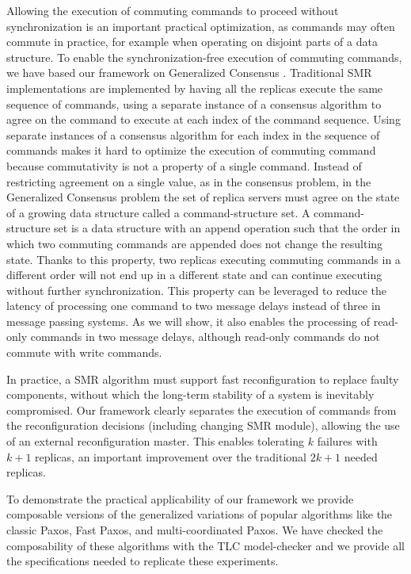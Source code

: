 Allowing the execution of commuting commands to proceed without synchronization is an important practical optimization, as commands may often commute in practice, for example when operating on disjoint parts of a data structure. 
To enable the synchronization-free execution of commuting commands, we have based our framework on Generalized Consensus \cite{Lamport05GeneralizeConsensus}. Traditional SMR implementations are implemented by having all the replicas execute the same sequence of commands, using a separate instance of a consensus algorithm to agree on the command to execute at each index of the command sequence. Using separate instances of a consensus algorithm for each index in the sequence of commands
makes it hard to optimize the execution of commuting command because commutativity is not a property of a single command.
Instead of restricting agreement on a single value, as in the consensus problem, in the  Generalized Consensus problem the set of replica servers must agree on the state of a growing data structure called a command-structure set. A command-structure set is a data structure with an append operation such that the order in which two commuting commands are appended does not change the resulting state. Thanks to this property, two replicas executing commuting commands in a different order will
not end up in a different state and can continue executing without further synchronization. This property can be leveraged to reduce the latency of processing one command to two message delays instead of three in message passing systems. As we will show, it also enables the processing of read-only commands in two message delays, although read-only commands do not commute with write commands.

In practice, a SMR algorithm must support fast reconfiguration to replace faulty components, without which the long-term stability of a system is inevitably compromised. Our framework clearly separates the execution of commands from the reconfiguration decisions (including changing SMR module), allowing the use of an external reconfiguration master. This enables tolerating $k$ failures with $k+1$ replicas, an important improvement over the traditional $2k+1$ needed replicas.

To demonstrate the practical applicability of our framework we provide composable versions of the generalized variations of popular algorithms like the classic Paxos, Fast Paxos, and multi-coordinated Paxos. We have checked the composability of these algorithms with the TLC model-checker and we provide all the specifications needed to replicate these experiments.

